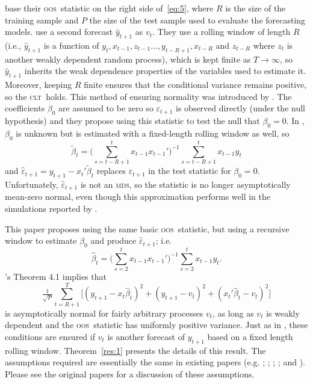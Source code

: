 \documentclass[10pt,fleqn,draft]{article}
\newcommand\citepos[2][]{\citeauthor{#2}'s \citeyearpar[#1]{#2}}
\theoremstyle{definition}
\newcommand{\clt}{\textsc{clt}}
\newcommand{\mds}{\textsc{mds}}
\newcommand{\oos}{\textsc{oos}}
\begin{document}
\citet{ClW:06,ClW:07} base their \oos\ statistic on the right side
of~\eqref{eq:5}, where $R$ is the size of the training sample and $P$
the size of the test sample used to evaluate the forecasting models.
\citet{ClW:06} use a second forecast $\hat{y}_{t+1}$ as $v_t$.  They
use a rolling window of length $R$ (i.e., $\hat{y}_{t+1}$ is a
function of $y_t, x_{t-1}, z_{t-1} \dots, y_{t-R+1}, x_{t-R}$ and
$z_{t-R}$ where $z_t$ is another weakly dependent random process),
which is kept finite as $T \to \infty$, so $\hat{y}_{t+1}$ inherits
the weak dependence properties of the variables used to estimate it.
Moreover, keeping $R$ finite ensures that the conditional variance
remains positive, so the \clt\ holds.  This method of ensuring
normality was introduced by \citet{GiW:06}.  The coefficients
$\beta_0$ are assumed to be zero so $\varepsilon_{t+1}$ is observed
directly (under the null hypothesis) and they propose using this
statistic to test the null that $\beta_0 = 0$.  In \citet{ClW:07},
$\beta_0$ is unknown but is estimated with a fixed-length rolling
window as well, so
\begin{equation*}
  \tilde{\beta}_t = \Big(\sum_{s=t-R+1}^t x_{t-1} x_{t-1}'\Big)^{-1}
  \sum_{s=t-R+1}^t x_{t-1} y_t
\end{equation*}
and $\hat{\varepsilon}_{t+1} = y_{t+1} - x_t'\tilde{\beta}_t$ replaces
$\varepsilon_{t+1}$ in the test statistic for $\beta_0 = 0$.
Unfortunately, $\hat{\varepsilon}_{t+1}$ is not an \mds, so the
statistic is no longer asymptotically mean-zero normal, even though
this approximation performs well in the simulations reported by
\citet{ClW:07}.

This paper proposes using the same basic \oos\ statistic, 
but using a recursive window to estimate $\beta_0$ and produce
$\hat{\varepsilon}_{t+1}$; i.e.
\begin{equation}
  \label{eq:8}
  \hat{\beta}_t = \Big(\sum_{s=2}^{t} x_{t-1} x_{t-1}'\Big)^{-1}
  \sum_{s=2}^t x_{t-1} y_t.
\end{equation}
\citepos{Wes:96} Theorem 4.1 implies that
\begin{equation*}
  \tfrac{1}{\sqrt{P}} \sum_{t=R+1}^T \Big[(y_{t+1} -
  x_t\hat{\beta}_t)^2 + (y_{t+1} - v_t)^2 + (x_t'\hat{\beta}_t - v_t)^2 \Big]
\end{equation*}
is asymptotically normal for fairly arbitrary processes $v_t$, as long
as $v_t$ is weakly dependent and the \oos\ statistic has uniformly
positive variance.  Just as in \citet{ClW:06}, these conditions are
ensured if $v_t$ is another forecast of $y_{t+1}$ based on a fixed
length rolling window.  Theorem~\ref{res:1} presents the details of
this result.  The assumptions required are essentially the same in
existing papers (e.g. \citealp{Wes:96}; \citealp{WeM:98};
\citealp{Mcc:00}; \citealp{GiW:06}; and \citealp{ClW:06,ClW:07}).
Please see the original papers for a discussion of these assumptions.
\end{document}
